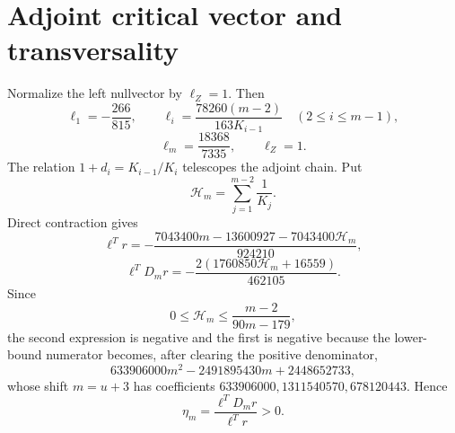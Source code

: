 \section*{Adjoint critical vector and transversality}
Normalize the left nullvector by $\ell_Z=1$.  Then
\[
\ell_1=-\frac{266}{815},
\qquad
\ell_i=\frac{78260(m-2)}{163K_{i-1}}
\quad(2\le i\le m-1),
\]
\[
\ell_m=\frac{18368}{7335},
\qquad
\ell_Z=1.
\]
The relation $1+d_i=K_{i-1}/K_i$ telescopes the adjoint chain.  Put
\[
\mathcal H_m=\sum_{j=1}^{m-2}\frac1{K_j}.
\]
Direct contraction gives
\[
\ell^Tr=-\frac{7043400m-13600927-7043400\mathcal H_m}{924210},
\]
\[
\ell^TD_mr=-\frac{2(1760850\mathcal H_m+16559)}{462105}.
\]
Since
\[
0\le \mathcal H_m\le\frac{m-2}{90m-179},
\]
the second expression is negative and the first is negative because the
lower-bound numerator becomes, after clearing the positive denominator,
\[
633906000m^2-2491895430m+2448652733,
\]
whose shift $m=u+3$ has coefficients
$633906000,1311540570,678120443$.  Hence
\[
\eta_m=\frac{\ell^TD_mr}{\ell^Tr}>0.
\]
